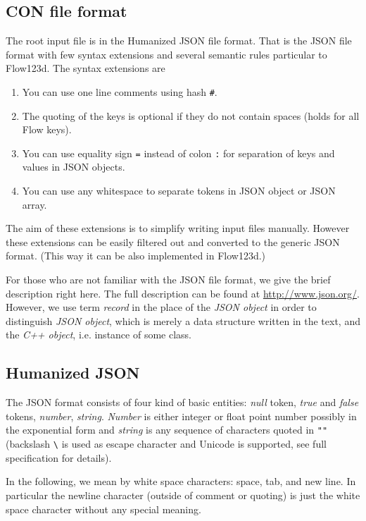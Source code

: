 \subsection{CON file format}
The root input file is in the Humanized JSON file format. That is the JSON file format with few syntax extensions and several semantic rules particular to
Flow123d. The syntax extensions are
\begin{enumerate}
\item You can use one line comments using hash \verb'#'.
\item The quoting of the keys is optional if they do not contain spaces (holds for all Flow keys).
\item You can use equality sign \verb'=' instead of colon \verb':' for separation of keys and values in JSON objects.
\item You can use any whitespace to separate tokens in JSON object or JSON array.
\end{enumerate}
The aim of these extensions is to simplify writing input files manually. However these extensions can be easily filtered out and converted to 
the generic JSON format. (This way it can be also implemented in Flow123d.)

For those who are not familiar with the JSON file format, we give the brief description right here. The full description can be found at
\url{http://www.json.org/}. However, we use term {\it record} in the place of the {\it JSON object} in order to distinguish {\it JSON object}, 
which is merely a data structure written in the text, and the {\it C++ object}, i.e. instance of some class. 

\subsection{Humanized JSON}
\label{sec:main_input}
The JSON format consists of four kind of basic entities: 
{\it null} token, {\it true} and {\it false} tokens, {\it number}, {\it string}. {\it Number} is either integer or float point number 
possibly in the exponential form and {\it string} is any sequence of characters quoted in \verb'""' (backslash \verb"\" is used as escape character and 
Unicode is supported, see full specification for details). 

In the following, we mean by white space characters:
space, tab, and new line. In particular the newline character (outside of comment or quoting) is just the white space character without any special meaning.

